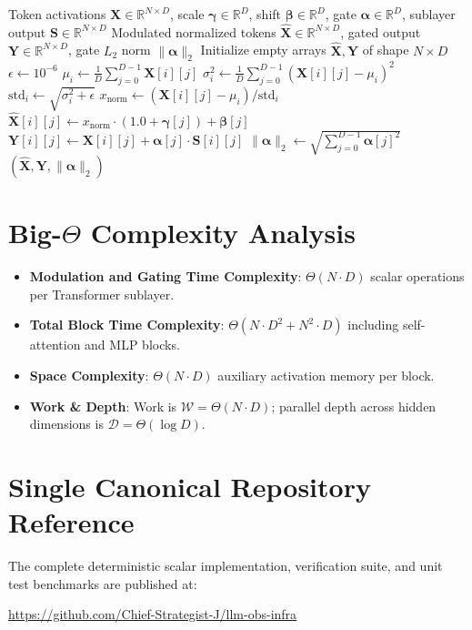 \documentclass[11pt,a4paper]{article}
\theoremstyle{definition}
\begin{document}
\begin{algorithm}[H]
\caption{Diffusion Transformer adaLN-Zero Modulation and Residual Gating}
\begin{algorithmic}[1]
\Require Token activations $\mathbf{X} \in \mathbb{R}^{N \times D}$, scale $\boldsymbol{\gamma} \in \mathbb{R}^D$, shift $\boldsymbol{\beta} \in \mathbb{R}^D$, gate $\boldsymbol{\alpha} \in \mathbb{R}^D$, sublayer output $\mathbf{S} \in \mathbb{R}^{N \times D}$
\Ensure Modulated normalized tokens $\hat{\mathbf{X}} \in \mathbb{R}^{N \times D}$, gated output $\mathbf{Y} \in \mathbb{R}^{N \times D}$, gate $L_2$ norm $\|\boldsymbol{\alpha}\|_2$
\State Initialize empty arrays $\hat{\mathbf{X}}, \mathbf{Y}$ of shape $N \times D$
\State $\epsilon \gets 10^{-6}$
    \State $\mu_i \gets \frac{1}{D}\sum_{j=0}^{D-1} \mathbf{X}[i][j]$
    \State $\sigma^2_i \gets \frac{1}{D}\sum_{j=0}^{D-1} (\mathbf{X}[i][j] - \mu_i)^2$
    \State $\text{std}_i \gets \sqrt{\sigma^2_i + \epsilon}$
        \State $x_{\text{norm}} \gets (\mathbf{X}[i][j] - \mu_i) / \text{std}_i$
        \State $\hat{\mathbf{X}}[i][j] \gets x_{\text{norm}} \cdot (1.0 + \boldsymbol{\gamma}[j]) + \boldsymbol{\beta}[j]$
        \State $\mathbf{Y}[i][j] \gets \mathbf{X}[i][j] + \boldsymbol{\alpha}[j] \cdot \mathbf{S}[i][j]$
    \EndFor
\EndFor
\State $\|\boldsymbol{\alpha}\|_2 \gets \sqrt{\sum_{j=0}^{D-1} \boldsymbol{\alpha}[j]^2}$
\State \Return $(\hat{\mathbf{X}}, \mathbf{Y}, \|\boldsymbol{\alpha}\|_2)$
\end{algorithmic}
\end{algorithm}

\section{Big-$\Theta$ Complexity Analysis}

\begin{itemize}
    \item \textbf{Modulation and Gating Time Complexity}: $\Theta(N \cdot D)$ scalar operations per Transformer sublayer.
    \item \textbf{Total Block Time Complexity}: $\Theta(N \cdot D^2 + N^2 \cdot D)$ including self-attention and MLP blocks.
    \item \textbf{Space Complexity}: $\Theta(N \cdot D)$ auxiliary activation memory per block.
    \item \textbf{Work \& Depth}: Work is $\mathcal{W} = \Theta(N \cdot D)$; parallel depth across hidden dimensions is $\mathcal{D} = \Theta(\log D)$.
\end{itemize}

\section{Single Canonical Repository Reference}

The complete deterministic scalar implementation, verification suite, and unit test benchmarks are published at:
\begin{center}
\url{https://github.com/Chief-Strategist-J/llm-obs-infra}
\end{center}
\end{document}
